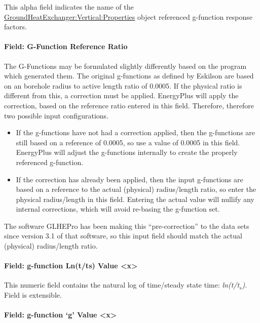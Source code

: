 This alpha field indicates the name of the \hyperref[groundheatexchangerverticalproperties]{GroundHeatExchanger:Vertical:Properties} object referenced g-function response factors.

\paragraph{Field: G-Function Reference Ratio}\label{field-g-function-reference-ratio}

The G-Functions may be formulated slightly differently based on the program which generated them. The original g-functions as defined by Eskilson are based on an borehole radius to active length ratio of 0.0005. If the physical ratio is different from this, a correction must be applied. EnergyPlus will apply the correction, based on the reference ratio entered in this field. Therefore, therefore two possible input configurations.

\begin{itemize}
\item
  If the g-functions have not had a correction applied, then the g-functions are still based on a reference of 0.0005, so use a value of 0.0005 in this field. EnergyPlus will adjust the g-functions internally to create the properly referenced g-function.
\item
  If the correction has already been applied, then the input g-functions are based on a reference to the actual (physical) radius/length ratio, so enter the physical radius/length in this field. Entering the actual value will nullify any internal corrections, which will avoid re-basing the g-function set.
\end{itemize}

The software GLHEPro has been making this ``pre-correction'' to the data sets since version 3.1 of that software, so this input field should match the actual (physical) radius/length ratio.

\paragraph{Field: g-function Ln(t/ts) Value \textless{}x\textgreater{}}\label{field-g-function-lntts-value-x}

This numeric field contains the natural log of time/steady state time: \emph{ln(t/t\(_{s}\))}. Field is extensible.

\paragraph{Field: g-function `g' Value \textless{}x\textgreater{}}\label{field-g-function-g-value-x}

